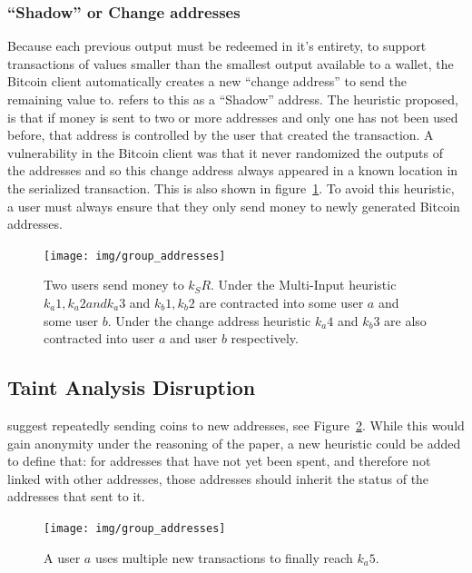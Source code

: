 \subsubsection{``Shadow'' or Change addresses}
Because each previous output must be redeemed in it's entirety, to support transactions of values smaller than the smallest output available to a wallet, the Bitcoin client automatically creates a new ``change address'' to send the remaining value to.  \cite{eval-priv} refers to this as a ``Shadow'' address.  The heuristic proposed, is that if money is sent to two or more addresses and only one has not been used before, that address is controlled by the user that created the transaction. A vulnerability in the Bitcoin client was that it never randomized the outputs of the addresses and so this change address always appeared in a known location in the serialized transaction\cite{cve-ordered-trans}. This is also shown in figure~\ref{fig:multi-spend}. To avoid this heuristic, a user must always ensure that they only send money to newly generated Bitcoin addresses.

\begin{figure}[t!]
    \centering
    \texttt{[image: img/group\_addresses]}
     \caption{Two users send money to $k_SR$. Under the Multi-Input  heuristic $k_a1, k_a2 and k_a3$ and $k_b1, k_b2$ are contracted into  some user $a$ and some user $b$. Under the change address heuristic  $k_a4$ and $k_b3$ are also contracted into user $a$ and user $b$  respectively. }
    \label{fig:multi-spend}
\end{figure}

\subsection{Taint Analysis Disruption}
\textcite{reid-anon} suggest repeatedly sending coins to new addresses, see Figure~\ref{fig:multi-new-addresses}. While this would gain anonymity under the reasoning of the paper, a new heuristic could be added to define that: for addresses that have not yet been spent, and therefore not linked with other addresses, those addresses should inherit the status of the addresses that sent to it.

\begin{figure}[t!]
    \centering
    \texttt{[image: img/group\_addresses]}
      \caption{A user $a$ uses multiple new transactions to finally reach $k_a5$. }
    \label{fig:multi-new-addresses}
\end{figure}

